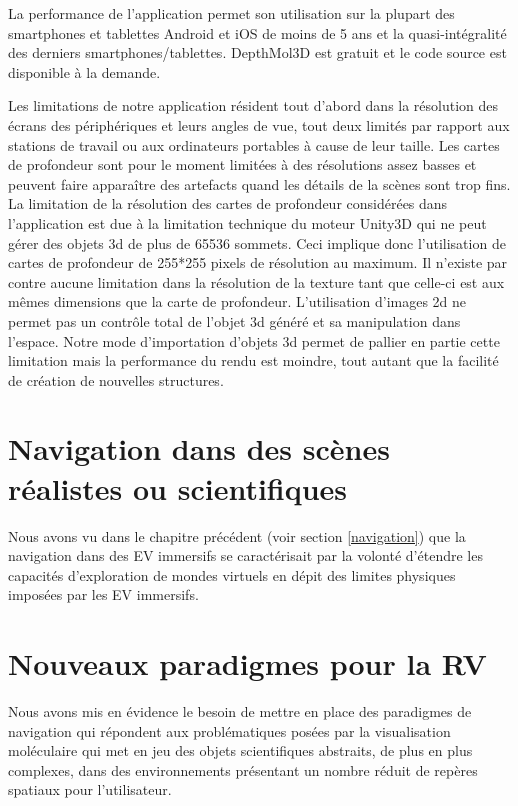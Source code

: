 La performance de l'application permet son utilisation sur la plupart des smartphones et tablettes Android et iOS de moins de 5 ans et la quasi-intégralité des derniers smartphones/tablettes. DepthMol3D est gratuit et le code source est disponible à la demande.

Les limitations de notre application résident tout d'abord dans la résolution des écrans des périphériques et leurs angles de vue, tout deux limités par rapport aux stations de travail ou aux ordinateurs portables à cause de leur taille. Les cartes de profondeur sont pour le moment limitées à des résolutions assez basses et peuvent faire apparaître des artefacts quand les détails de la scènes sont trop fins. La limitation de la résolution des cartes de profondeur considérées dans l'application est due à la limitation technique du moteur Unity3D qui ne peut gérer des objets 3d de plus de 65536 sommets. Ceci implique donc l'utilisation de cartes de profondeur de 255*255 pixels de résolution au maximum. Il n'existe par contre aucune limitation dans la résolution de la texture tant que celle-ci est aux mêmes dimensions que la carte de profondeur. L'utilisation d'images 2d ne permet pas un contrôle total de l'objet 3d généré et sa manipulation dans l'espace. Notre mode d'importation d'objets 3d permet de pallier en partie cette limitation mais la performance du rendu est moindre, tout autant que la facilité de création de nouvelles structures.


\section{Navigation dans des scènes réalistes ou scientifiques}

Nous avons vu dans le chapitre précédent (voir section \ref{navigation}) que la navigation dans des EV immersifs se caractérisait par la volonté d'étendre les capacités d'exploration de mondes virtuels en dépit des limites physiques imposées par les EV immersifs.

\section{Nouveaux paradigmes pour la RV}

Nous avons mis en évidence le besoin de mettre en place des paradigmes de navigation qui répondent aux problématiques posées par la visualisation moléculaire qui met en jeu des objets scientifiques abstraits, de plus en plus complexes, dans des environnements présentant un nombre réduit de repères spatiaux pour l'utilisateur.


